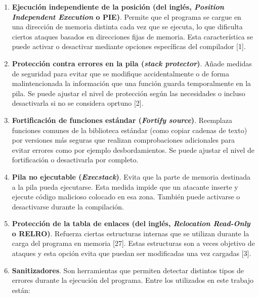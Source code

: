 \begin{enumerate}
\def\labelenumi{\arabic{enumi}.}
\item
  \textbf{Ejecución independiente de la posición (del inglés, \emph{Position Independent Execution} o PIE)}.
  Permite que el programa se cargue en una dirección de memoria distinta
  cada vez que se ejecuta, lo que dificulta ciertos ataques basados en
  direcciones fijas de memoria. Esta característica se puede activar o
  desactivar mediante opciones específicas del compilador [1].
\item
  \textbf{Protección contra errores en la pila (\emph{stack protector})}.
  Añade medidas de seguridad para evitar que se modifique
  accidentalmente o de forma malintencionada la información que una
  función guarda temporalmente en la pila. Se puede ajustar el nivel de
  protección según las necesidades o incluso desactivarla si no se considera
  oprtuno [2].
\item
  \textbf{Fortificación de funciones estándar (\emph{Fortify source})}.
  Reemplaza funciones comunes de la biblioteca estándar (como copiar
  cadenas de texto) por versiones más seguras que realizan
  comprobaciones adicionales para evitar errores como por ejemplo desbordamientos.
  Se puede ajustar el nivel de fortificación o desactivarla por
  completo.
\item
  \textbf{Pila no ejecutable (\emph{Execstack})}.
  Evita que la parte de memoria destinada a la pila pueda ejecutarse. 
  Esta medida impide que un atacante inserte y ejecute código
  malicioso colocado en esa zona. También puede activarse o desactivarse
  durante la compilación.
\item
  \textbf{Protección de la tabla de enlaces (del inglés, \emph{Relocation Read-Only} o RELRO)}.
  Refuerza ciertas estructuras internas que se utilizan durante la carga del
  programa en memoria [27]. Estas estructuras son a veces objetivo de
  ataques y esta opción evita que puedan ser modificadas una vez
  cargadas [3].
\item
  \textbf{Sanitizadores}.
  Son herramientas que permiten detectar distintos tipos de errores
  durante la ejecución del programa. Entre los utilizados en este
  trabajo están:


\end{enumerate}
